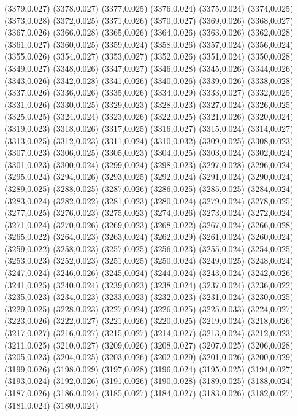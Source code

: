 (3379,0.027)
(3378,0.027)
(3377,0.025)
(3376,0.024)
(3375,0.024)
(3374,0.025)
(3373,0.028)
(3372,0.025)
(3371,0.026)
(3370,0.027)
(3369,0.026)
(3368,0.027)
(3367,0.026)
(3366,0.028)
(3365,0.026)
(3364,0.026)
(3363,0.026)
(3362,0.028)
(3361,0.027)
(3360,0.025)
(3359,0.024)
(3358,0.026)
(3357,0.024)
(3356,0.024)
(3355,0.026)
(3354,0.027)
(3353,0.027)
(3352,0.026)
(3351,0.024)
(3350,0.028)
(3349,0.027)
(3348,0.026)
(3347,0.027)
(3346,0.028)
(3345,0.026)
(3344,0.026)
(3343,0.026)
(3342,0.028)
(3341,0.026)
(3340,0.026)
(3339,0.026)
(3338,0.028)
(3337,0.026)
(3336,0.026)
(3335,0.026)
(3334,0.029)
(3333,0.027)
(3332,0.025)
(3331,0.026)
(3330,0.025)
(3329,0.023)
(3328,0.023)
(3327,0.024)
(3326,0.025)
(3325,0.025)
(3324,0.024)
(3323,0.026)
(3322,0.025)
(3321,0.026)
(3320,0.024)
(3319,0.023)
(3318,0.026)
(3317,0.025)
(3316,0.027)
(3315,0.024)
(3314,0.027)
(3313,0.025)
(3312,0.023)
(3311,0.024)
(3310,0.032)
(3309,0.025)
(3308,0.023)
(3307,0.023)
(3306,0.025)
(3305,0.023)
(3304,0.025)
(3303,0.024)
(3302,0.024)
(3301,0.023)
(3300,0.024)
(3299,0.024)
(3298,0.023)
(3297,0.028)
(3296,0.024)
(3295,0.024)
(3294,0.026)
(3293,0.025)
(3292,0.024)
(3291,0.024)
(3290,0.024)
(3289,0.025)
(3288,0.025)
(3287,0.026)
(3286,0.025)
(3285,0.025)
(3284,0.024)
(3283,0.024)
(3282,0.022)
(3281,0.023)
(3280,0.024)
(3279,0.024)
(3278,0.025)
(3277,0.025)
(3276,0.023)
(3275,0.023)
(3274,0.026)
(3273,0.024)
(3272,0.024)
(3271,0.024)
(3270,0.026)
(3269,0.023)
(3268,0.022)
(3267,0.024)
(3266,0.028)
(3265,0.022)
(3264,0.023)
(3263,0.024)
(3262,0.029)
(3261,0.024)
(3260,0.024)
(3259,0.022)
(3258,0.023)
(3257,0.025)
(3256,0.023)
(3255,0.024)
(3254,0.025)
(3253,0.023)
(3252,0.023)
(3251,0.025)
(3250,0.024)
(3249,0.025)
(3248,0.024)
(3247,0.024)
(3246,0.026)
(3245,0.024)
(3244,0.024)
(3243,0.024)
(3242,0.026)
(3241,0.025)
(3240,0.024)
(3239,0.023)
(3238,0.024)
(3237,0.024)
(3236,0.022)
(3235,0.023)
(3234,0.023)
(3233,0.023)
(3232,0.023)
(3231,0.024)
(3230,0.025)
(3229,0.025)
(3228,0.023)
(3227,0.024)
(3226,0.025)
(3225,0.033)
(3224,0.027)
(3223,0.026)
(3222,0.027)
(3221,0.026)
(3220,0.025)
(3219,0.024)
(3218,0.026)
(3217,0.027)
(3216,0.027)
(3215,0.027)
(3214,0.027)
(3213,0.024)
(3212,0.023)
(3211,0.025)
(3210,0.027)
(3209,0.026)
(3208,0.027)
(3207,0.025)
(3206,0.028)
(3205,0.023)
(3204,0.025)
(3203,0.026)
(3202,0.029)
(3201,0.026)
(3200,0.029)
(3199,0.026)
(3198,0.029)
(3197,0.028)
(3196,0.024)
(3195,0.025)
(3194,0.027)
(3193,0.024)
(3192,0.026)
(3191,0.026)
(3190,0.028)
(3189,0.025)
(3188,0.024)
(3187,0.026)
(3186,0.024)
(3185,0.027)
(3184,0.027)
(3183,0.026)
(3182,0.027)
(3181,0.024)
(3180,0.024)
